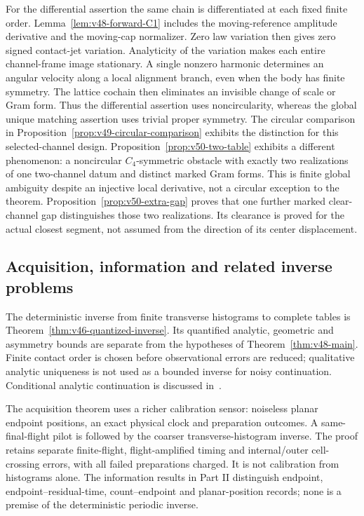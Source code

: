For the differential assertion the same chain is differentiated at each
fixed finite order.  Lemma~\ref{lem:v48-forward-C1} includes the
moving-reference amplitude derivative and the moving-cap normalizer.
Zero law variation then gives zero signed contact-jet variation.
Analyticity of the variation makes each entire channel-frame image
stationary.  A single nonzero harmonic determines an angular velocity
along a local alignment branch, even when the body has finite symmetry.
The lattice cochain then eliminates an invisible change of scale or Gram
form.  Thus the differential assertion uses noncircularity, whereas the
global unique matching assertion uses trivial proper symmetry.  The
circular comparison in Proposition~\ref{prop:v49-circular-comparison}
exhibits the distinction for this selected-channel design.
Proposition~\ref{prop:v50-two-table} exhibits a different phenomenon:
a noncircular $C_4$-symmetric obstacle with exactly two realizations of
one two-channel datum and distinct marked Gram forms.  This is finite
global ambiguity despite an injective local derivative, not a circular
exception to the theorem.  Proposition~\ref{prop:v50-extra-gap} proves
that one further marked clear-channel gap distinguishes those two
realizations.  Its clearance is proved for the actual closest segment,
not assumed from the direction of its center displacement.

\subsection{Acquisition, information and related inverse problems}

The deterministic inverse from finite transverse histograms to complete
tables is Theorem~\ref{thm:v46-quantized-inverse}.  Its quantified
analytic, geometric and asymmetry bounds are separate from the hypotheses
of Theorem~\ref{thm:v48-main}.  Finite contact order is chosen before
observational errors are reduced; qualitative analytic uniqueness is not
used as a bounded inverse for noisy continuation.  Conditional analytic
continuation is discussed in~\cite{Trefethen2020}.

The acquisition theorem uses a richer calibration sensor: noiseless
planar endpoint positions, an exact physical clock and preparation
outcomes.  A same-final-flight pilot is followed by the coarser
transverse-histogram inverse.  The proof retains separate finite-flight,
flight-amplified timing and internal/outer cell-crossing errors, with all
failed preparations charged.  It is not calibration from histograms
alone.  The information results in Part II distinguish endpoint,
endpoint--residual-time, count--endpoint and planar-position records;
none is a premise of the deterministic periodic inverse.


